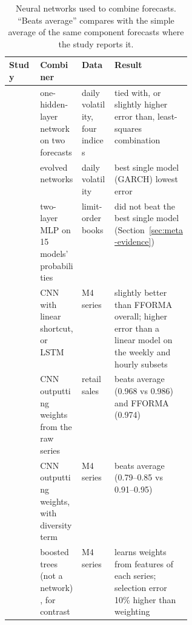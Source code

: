 \begin{table}[!htbp]
\centering\footnotesize
\caption{Neural networks used to combine forecasts. ``Beats average'' compares with the simple average of the
same component forecasts where the study reports it.}
\label{tab:nncomb}
\setlength{\tabcolsep}{3pt}
\begin{tabularx}{\linewidth}{>{\raggedright\arraybackslash}p{0.17\linewidth}>{\raggedright\arraybackslash}X>{\raggedright\arraybackslash}p{0.18\linewidth}>{\raggedright\arraybackslash}X}
\toprule
Study & Combiner & Data & Result \\
\midrule
\citet{donaldson1996annc} & one-hidden-layer network on two forecasts & daily volatility, four indices & tied with, or slightly higher error than, least-squares combination \\
\citet{harrald1997} & evolved networks & daily volatility & best single model (GARCH) lowest error \\
\citet{prata2024} & two-layer MLP on 15 models' probabilities & limit-order books & did not beat the best single model (Section~\ref{sec:meta-evidence}) \\
\citet{zhao2020for2for} & CNN with linear shortcut, or LSTM & M4 series & slightly better than FFORMA overall; higher error than a linear model on the weekly and hourly subsets \\
\citet{mafildes2021} & CNN outputting weights from the raw series & retail sales & beats average (0.968 vs 0.986) and FFORMA (0.974) \\
\citet{felici2026mtl} & CNN outputting weights, with diversity term & M4 series & beats average (0.79--0.85 vs 0.91--0.95) \\
\citet{montero2020fforma} & boosted trees (not a network), for contrast & M4 series & learns weights from features of each series; selection error 10\% higher than weighting \\
\bottomrule
\end{tabularx}
\end{table}

